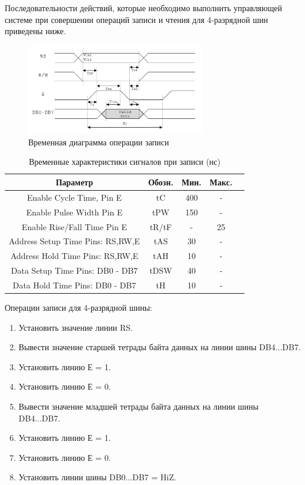 Последовательности действий, которые необходимо выполнить 
управляющей системе при совершении операций записи и чтения 
для 4-разрядной шин приведены ниже.

\begin{figure}[!ht]
	\centering
	\includegraphics[width=0.7\textwidth]{image/LCD_WR_2.PNG}
	\caption{Временная диаграмма операции записи}
	\label{full_adder}
\end{figure}

\begin{table}[!ht]
	\begin{center}
		\begin{tabular}{c c c c c}
			\hline\hline
			Параметр 							& Обозн. 	& Мин. 	& Макс. \\
			\hline
			Enable Cycle Time, Pin E 			& tC		& 400 	& 	- 	\\
			Enable Pulse Width Pin E 			& tPW 		& 150 	& 	- 	\\
			Enable Rise/Fall Time Pin E 		& tR/tF 	& - 	& 	25	\\
			Address Setup Time Pins: RS,RW,E 	& tAS 		& 30 	& 	-	\\
			Address Hold Time Pins: RS,RW,E 	& tAH 		& 10 	& 	-	\\
			Data Setup Time Pins: DB0 - DB7 	& tDSW 		& 40 	& 	-	\\
			Data Hold Time Pins: DB0 - DB7  	& tH 		& 10 	& 	-	\\
			\hline
		\end{tabular}
		\caption{Временные характеристики сигналов при записи (нс)}
		\label{LCD_TO_FPGA_WR_TABLE}
	\end{center}
\end{table}

Операции записи для 4-разрядной шины:
\begin{enumerate}
	\item Установить значение линии RS.
	\item Вывести значение старшей тетрады байта данных на линии шины DB4...DB7.
	\item Установить линию Е = 1.
	\item Установить линию Е = 0.
	\item Вывести значение младшей тетрады байта данных на линии шины DB4...DB7.
	\item Установить линию Е = 1.
	\item Установить линию Е = 0.
	\item Установить линии шины DB0...DB7 = HiZ.
\end{enumerate}

